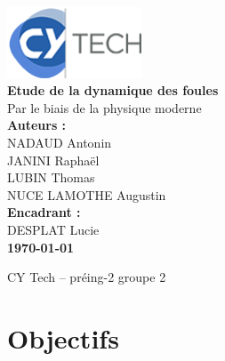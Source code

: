 \documentclass[a4paper,12pt]{article}
\begin{document}
\begin{titlepage}
	\centering
	\includegraphics[width=4cm]{logo.png} \\[1cm]  %

	{\LARGE \textbf{Etude de la dynamique des foules}} \\[0.5cm]
    
	{\large Par le biais de la physique moderne} \\[1.5cm]

	\textbf{Auteurs :} \\[0.3cm]
	NADAUD Antonin \\
	JANINI  Raphaël \\
	LUBIN Thomas \\
	NUCE LAMOTHE Augustin \\[1cm]

	\textbf{Encadrant :} \\[0.3cm]
	DESPLAT Lucie \\[1.5cm]

	\textbf{\today}  %
	\\[2cm]

	\vfill %

	{\large CY Tech – préing-2 groupe 2} \\

\end{titlepage}

\newpage
\thispagestyle{empty}  %
\mbox{}  %

\newpage


\renewcommand{\contentsname}{Sommaire}  %
\thispagestyle{empty}
\tableofcontents  %

\newpage

\setcounter{page}{1} %

\section{Objectifs}
\end{document}

